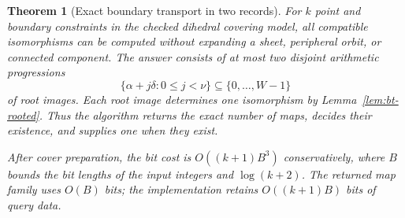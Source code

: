 \documentclass[11pt]{article}
\newtheorem{theorem}{Theorem}[section]
\theoremstyle{definition}
\theoremstyle{remark}
\begin{document}
\begin{theorem}[Exact boundary transport in two records]\label{thm:bt-two-records}
For $k$ point and boundary constraints in the checked dihedral covering
model, all compatible isomorphisms can be computed without expanding a
sheet, peripheral orbit, or connected component.  The answer consists of
at most two disjoint arithmetic progressions
\[
 \{\alpha+j\delta:0\le j<\nu\}\subseteq\{0,\ldots,W-1\}
\]
of root images.  Each root image determines one isomorphism by
Lemma~\ref{lem:bt-rooted}.  Thus the algorithm returns the exact number of
maps, decides their existence, and supplies one when they exist.

After cover preparation, the bit cost is
$O((k+1)B^3)$ conservatively, where $B$ bounds the bit lengths of the
input integers and $\log(k+2)$.  The returned map family uses $O(B)$ bits;
the implementation retains $O((k+1)B)$ bits of query data.
\end{theorem}
\end{document}
